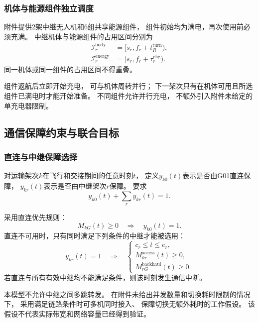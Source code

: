 \documentclass[bwprint]{gmcmthesis}
\begin{document}
\subsubsection{机体与能源组件独立调度}

附件提供2架中继无人机和6组共享能源组件，
组件初始均为满电，再次使用前必须充满。
中继机体与能源组件的占用区间分别为
\begin{align}
    \mathcal{I}_r^{\mathrm{body}}
    &=
    [s_r,f_r+t_R^{\mathrm{turn}}),\\
    \mathcal{I}_r^{\mathrm{energy}}
    &=
    [s_r,f_r+\tau_r^{\mathrm{chg}}).
\end{align}
同一机体或同一组件的占用区间不得重叠。

组件返航后立即开始充电，
可与机体周转并行；
下一架次只有在机体可用且所选组件已满电时才能开始准备。
不同组件允许并行充电，
不额外引入附件未给定的单充电器限制。

\subsection{通信保障约束与联合目标}

\subsubsection{直连与中继保障选择}

对运输架次$k$在飞行和交接期间的任意时刻$t$，
定义$y_{k0}(t)$表示是否由G01直连保障，
$y_{kr}(t)$表示是否由中继架次$r$保障。
要求
\begin{equation}
    y_{k0}(t)+\sum_r y_{kr}(t)=1.
\end{equation}

采用直连优先规则：
\begin{equation}
    M_{kG}(t)\geq0
    \quad\Longrightarrow\quad
    y_{k0}(t)=1.
\end{equation}
直连不可用时，只有同时满足下列条件的中继才能被选用：
\begin{equation}
    y_{kr}(t)=1
    \quad\Longrightarrow\quad
    \begin{cases}
        c_r\leq t\leq e_r,\\
        M_{kr}^{\mathrm{access}}(t)\geq0,\\
        M_{rG}^{\mathrm{backhaul}}(t)\geq0.
    \end{cases}
    \label{eq:q3_relay_coverage}
\end{equation}
若直连与所有有效中继均不能满足条件，则该时刻发生通信中断。

本模型不允许中继之间多跳转发。
在附件未给出并发数量和切换耗时限制的情况下，
采用满足链路条件时可多机同时接入、
保障切换无额外耗时的工作假设。
该假设不代表实际带宽和网络容量已经得到验证。
\end{document}
